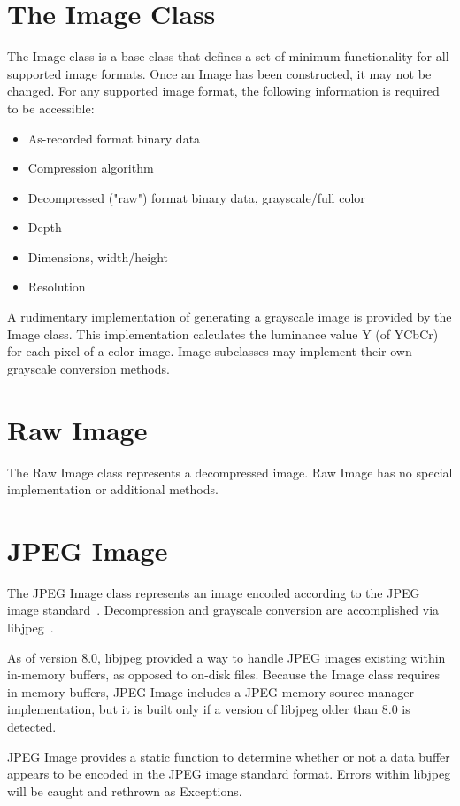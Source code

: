 \section{The Image Class}
\label{sec-imageclass}
The Image class is a base class that defines a set of minimum functionality for
all supported image formats.  Once an Image has been constructed, it may not
be changed.  For any supported image format, the following information is
required to be accessible:
\begin{itemize}
\item As-recorded format binary data
\item Compression algorithm
\item Decompressed ("raw") format binary data, grayscale/full color
\item Depth
\item Dimensions, width/height
\item Resolution
\end{itemize}
A rudimentary implementation of generating a grayscale image is provided by the
Image class.  This implementation calculates the luminance value Y (of YCbCr)
for each pixel of a color image.  Image subclasses may implement their own
grayscale conversion methods.

\section{Raw Image}
\label{sec-rawimage}
The Raw Image class represents a decompressed image.  Raw Image has no special 
implementation or additional methods.

\section{JPEG Image}
\label{sec-jpegimage}
The JPEG Image class represents an image encoded according to the JPEG image 
standard~\cite{jpeg}.  Decompression and grayscale conversion are accomplished
via libjpeg~\cite{libjpeg}.

As of version 8.0, libjpeg provided a way to handle JPEG images existing within
in-memory buffers, as opposed to on-disk files.  Because the Image class
requires in-memory buffers, JPEG Image includes a JPEG memory source manager
implementation, but it is built only if a version of libjpeg older than 8.0
is detected.

JPEG Image provides a static function to determine whether or not a
data buffer appears to be encoded in the JPEG image standard format.  Errors
within libjpeg will be caught and rethrown as Exceptions.
